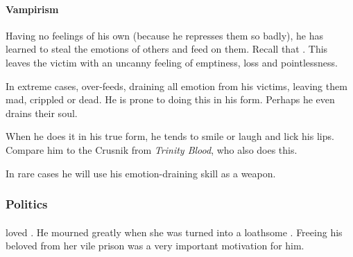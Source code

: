 \subsubsection{Vampirism}
Having no feelings of his own (because he represses them so badly), he has learned to steal the emotions of others and feed on them. Recall that . This leaves the victim with an uncanny feeling of emptiness, loss and pointlessness. 

In extreme cases, \Sithiyacaan{} over-feeds, draining all emotion from his victims, leaving them mad, crippled or dead. He is prone to doing this in his  form. Perhaps he even drains their soul. 

When he does it in his true form, he tends to smile or laugh and lick his lips. Compare him to the Crusnik from \emph{Trinity Blood}, who also does this.

In rare cases he will use his emotion-draining skill as a weapon.









\subsection{Politics}





\subsubsection{\Essenai}
\Sithiyacaan loved \Essenai. 
He mourned greatly when she was turned into a loathsome \sephirah. 
Freeing his beloved from her vile prison was a very important motivation for him. 























\chapter[Mystracht]{\Mystraacht}















